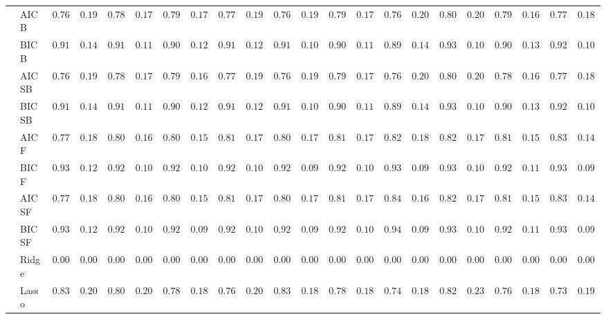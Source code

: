 \begin{tabular}{p{0.2cm}p{1cm}|p{0.6cm}p{0.6cm}|p{0.6cm}p{0.6cm}p{0.6cm}p{0.6cm}p{0.6cm}p{0.6cm}|p{0.6cm}p{0.6cm}p{0.6cm}p{0.6cm}p{0.6cm}p{0.6cm}|p{0.6cm}p{0.6cm}p{0.6cm}p{0.6cm}p{0.6cm}p{0.6cm}}
 & AIC B  & $0.7600$ & $0.1929$ & $0.7867$ & $0.1710$ & $0.7967$ & $0.1701$ & $0.7767$ & $0.1942$ & $0.7683$ & $0.1923$ & $0.7933$ & $0.1710$ & $0.7683$ & $0.2064$ & $0.8000$ & $0.2010$ & $0.7917$ & $0.1681$ & $0.7767$ & $0.1838$ \\
 & BIC B  & $0.9133$ & $0.1450$ & $0.9183$ & $0.1124$ & $0.9033$ & $0.1258$ & $0.9100$ & $0.1285$ & $0.9183$ & $0.1019$ & $0.9083$ & $0.1193$ & $0.8900$ & $0.1445$ & $0.9317$ & $0.1062$ & $0.9017$ & $0.1300$ & $0.9233$ & $0.1070$ \\
 & AIC SB  & $0.7600$ & $0.1929$ & $0.7850$ & $0.1713$ & $0.7950$ & $0.1689$ & $0.7767$ & $0.1942$ & $0.7683$ & $0.1923$ & $0.7933$ & $0.1710$ & $0.7683$ & $0.2064$ & $0.8000$ & $0.2010$ & $0.7867$ & $0.1660$ & $0.7767$ & $0.1838$ \\
 & BIC SB  & $0.9133$ & $0.1450$ & $0.9167$ & $0.1124$ & $0.9033$ & $0.1258$ & $0.9100$ & $0.1285$ & $0.9183$ & $0.1019$ & $0.9083$ & $0.1193$ & $0.8900$ & $0.1445$ & $0.9317$ & $0.1062$ & $0.9017$ & $0.1300$ & $0.9217$ & $0.1071$ \\
 & AIC F  & $0.7783$ & $0.1836$ & $0.8000$ & $0.1675$ & $0.8067$ & $0.1512$ & $0.8133$ & $0.1761$ & $0.8000$ & $0.1741$ & $0.8100$ & $0.1741$ & $0.8283$ & $0.1827$ & $0.8200$ & $0.1752$ & $0.8100$ & $0.1554$ & $0.8317$ & $0.1451$ \\
 & BIC F  & $0.9333$ & $0.1231$ & $0.9233$ & $0.1017$ & $0.9200$ & $0.1018$ & $0.9250$ & $0.1095$ & $0.9250$ & $0.0987$ & $0.9233$ & $0.1044$ & $0.9383$ & $0.0967$ & $0.9350$ & $0.1030$ & $0.9233$ & $0.1122$ & $0.9333$ & $0.0977$ \\
 & AIC SF  & $0.7783$ & $0.1836$ & $0.8000$ & $0.1675$ & $0.8067$ & $0.1512$ & $0.8133$ & $0.1761$ & $0.8017$ & $0.1703$ & $0.8117$ & $0.1703$ & $0.8483$ & $0.1677$ & $0.8200$ & $0.1752$ & $0.8100$ & $0.1554$ & $0.8333$ & $0.1441$ \\
 & BIC SF  & $0.9333$ & $0.1231$ & $0.9233$ & $0.1017$ & $0.9217$ & $0.0990$ & $0.9250$ & $0.1095$ & $0.9250$ & $0.0987$ & $0.9233$ & $0.1044$ & $0.9417$ & $0.0959$ & $0.9350$ & $0.1030$ & $0.9250$ & $0.1121$ & $0.9333$ & $0.0977$ \\
 & Ridge  & $0.0000$ & $0.0000$ & $0.0000$ & $0.0000$ & $0.0000$ & $0.0000$ & $0.0000$ & $0.0000$ & $0.0000$ & $0.0000$ & $0.0000$ & $0.0000$ & $0.0000$ & $0.0000$ & $0.0000$ & $0.0000$ & $0.0000$ & $0.0000$ & $0.0000$ & $0.0000$ \\
 & Lasso  & $0.8317$ & $0.2072$ & $0.8000$ & $0.2065$ & $0.7883$ & $0.1878$ & $0.7683$ & $0.2036$ & $0.8383$ & $0.1842$ & $0.7867$ & $0.1896$ & $0.7483$ & $0.1873$ & $0.8283$ & $0.2351$ & $0.7650$ & $0.1806$ & $0.7367$ & $0.1970$ \\

\end{tabular}
